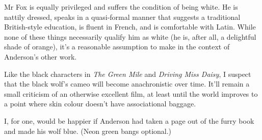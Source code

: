 Mr Fox is equally privileged and suffers the condition of being white. He is nattily dressed, speaks in a quasi-formal manner that suggests a traditional British-style education, is fluent in French, and is comfortable with Latin. While none of these things necessarily qualify him as white (he is, after all, a delightful shade of orange), it's a reasonable assumption to make in the context of Anderson's other work.

Like the black characters in \textit{The Green Mile} and \textit{Driving Miss Daisy}, I suspect that the black wolf's cameo will become anachronistic over time. It'll remain a small criticism of an otherwise excellent film, at least until the world improves to a point where skin colour doesn't have associational baggage.

I, for one, would be happier if Anderson had taken a page out of the furry book and made his wolf blue. (Neon green bangs optional.)
